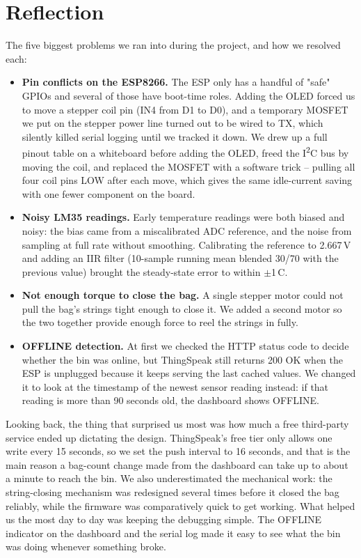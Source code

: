 \documentclass{article}
\begin{document}
\fi

\section{Reflection}
\label{sec:reflection}

The five biggest problems we ran into during the project, and how we resolved each:

\begin{itemize}
    \item \textbf{Pin conflicts on the ESP8266.} The ESP only has a handful of "safe" GPIOs and several of those have boot-time roles. Adding the OLED forced us to move a stepper coil pin (IN4 from D1 to D0), and a temporary MOSFET we put on the stepper power line turned out to be wired to TX, which silently killed serial logging until we tracked it down. We drew up a full pinout table on a whiteboard before adding the OLED, freed the I\textsuperscript{2}C bus by moving the coil, and replaced the MOSFET with a software trick -- pulling all four coil pins LOW after each move, which gives the same idle-current saving with one fewer component on the board.
    \item \textbf{Noisy LM35 readings.} Early temperature readings were both biased and noisy: the bias came from a miscalibrated ADC reference, and the noise from sampling at full rate without smoothing. Calibrating the reference to 2.667\,V and adding an IIR filter (10-sample running mean blended 30/70 with the previous value) brought the steady-state error to within $\pm$1\,\textdegree C.
    \item \textbf{Not enough torque to close the bag.} A single stepper motor could not pull the bag's strings tight enough to close it. We added a second motor so the two together provide enough force to reel the strings in fully.
    \item \textbf{OFFLINE detection.} At first we checked the HTTP status code to decide whether the bin was online, but ThingSpeak still returns 200 OK when the ESP is unplugged because it keeps serving the last cached values. We changed it to look at the timestamp of the newest sensor reading instead: if that reading is more than 90 seconds old, the dashboard shows OFFLINE.
\end{itemize}
\noindent
Looking back, the thing that surprised us most was how much a free third-party service ended up dictating the design. ThingSpeak's free tier only allows one write every 15 seconds, so we set the push interval to 16 seconds, and that is the main reason a bag-count change made from the dashboard can take up to about a minute to reach the bin. We also underestimated the mechanical work: the string-closing mechanism was redesigned several times before it closed the bag reliably, while the firmware was comparatively quick to get working. What helped us the most day to day was keeping the debugging simple. The OFFLINE indicator on the dashboard and the serial log made it easy to see what the bin was doing whenever something broke.


\ifdefined\mainfile\else
\end{document}
